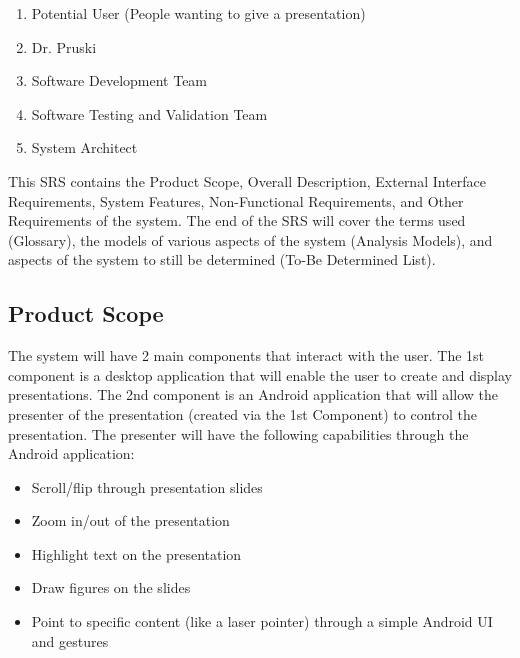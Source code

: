 \documentclass{article}
\begin{document}
\begin{enumerate}
\item Potential User (People wanting to give a presentation)
\item Dr. Pruski
\item Software Development Team
\item Software Testing and Validation Team
\item System Architect
\end{enumerate}

This SRS contains the Product Scope, Overall Description, External Interface Requirements, System Features, Non-Functional Requirements, and Other Requirements of the system. 
The end of the SRS will cover the terms used (Glossary), the models of various aspects of the system (Analysis Models), and aspects of the system to still be determined (To-Be Determined List).

\subsection{Product Scope}
The system will have 2 main components that interact with the user. 
The 1st component is a desktop application that will enable the user to create and display presentations. 
The 2nd component is an Android application that will allow the presenter of the presentation (created via the 1st Component) to control the presentation. 
The presenter will have the following capabilities through the Android application:
\begin{itemize}
\item Scroll/flip through presentation slides
\item Zoom in/out of the presentation
\item Highlight text on the presentation
\item Draw figures on the slides
\item Point to specific content (like a laser pointer) through a simple Android UI and gestures
\end{itemize}


\end{document}
